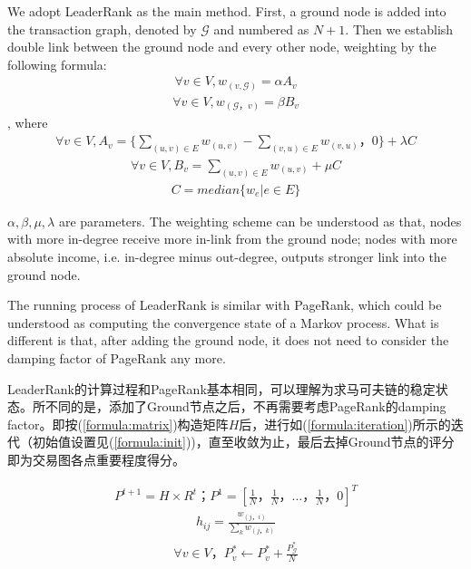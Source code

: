 We adopt LeaderRank\cite{Chen2013}\cite{Li2014} as the main method. First, a ground node is added into the transaction graph, denoted by $\mathcal{G}$ and numbered as $N+1$. Then we establish double link between the ground node and every other node, weighting by the following formula:
\begin{align}\label{formula:weight1}
	\forall v \in V, w_{(v, \mathcal{G})} = \alpha A_v
\end{align}
\begin{align}\label{formula:weight2}
\forall v \in V,  w_{(\mathcal{G}， v)} = \beta B_v
\end{align}
, where 
\begin{align}
	\forall v \in V, A_v = \{ \sum_{(u,v)\in E} w_{(u,v)} - \sum_{(v,u) \in E} w_{(v, u)}， 0 \} + \lambda C
\end{align}
\begin{align} \label{formula:b}
\forall v \in V,  B_v =  \sum_{(u,v) \in E} w_{(u,v)} + \mu C
\end{align}
\begin{align}
	C = median\{w_e| e \in E\}
\end{align}

$\alpha, \beta, \mu, \lambda$ are parameters. The weighting scheme can be understood as that, nodes with more in-degree receive more in-link from the ground node; nodes with more absolute income, i.e. in-degree minus out-degree, outputs stronger link into the ground node. 

The running process of LeaderRank is similar with PageRank, which could be understood as computing the convergence state of a Markov process. What is different is that, after adding the ground node, it does not need to consider the damping factor of PageRank\cite{Brin2010}\cite{page1999pagerank} any more.

LeaderRank的计算过程和PageRank基本相同，可以理解为求马可夫链的稳定状态。所不同的是，添加了Ground节点之后，不再需要考虑PageRank的damping factor\cite{Brin2010}\cite{page1999pagerank}。即按(\ref{formula:matrix})构造矩阵$H$后，进行如(\ref{formula:iteration})所示的迭代（初始值设置见(\ref{formula:init}))，直至收敛为止，最后去掉Ground节点的评分即为交易图各点重要程度得分。

\begin{align} \label{formula:iteration}
	P^{t+1} = H \times R^{t}； P^1=[\frac{1}{N}， \frac{1}{N}， \dots， \frac{1}{N}， 0]^T
\end{align}
\begin{align} \label{formula:matrix}
	h_{ij} = \frac{w_{(j，i)}}{\sum_k w_{(j，k)}}
\end{align}
\begin{align} \label{formula:init}
\forall v \in V， P^*_v \leftarrow P^*_v + \frac{P^*_{\mathcal{G}}}{N}
\end{align}



